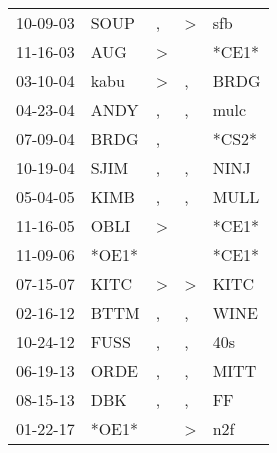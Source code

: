 \begin{supertabular}{lllll}
 10-09-03 &   SOUP &             , &     \textgreater &    sfb \\
 11-16-03 &    AUG &  \textgreater &                  &  *CE1* \\
 03-10-04 &   kabu &  \textgreater &                , &   BRDG \\
 04-23-04 &   ANDY &             , &                , &   mulc \\
 07-09-04 &   BRDG &             , &                  &  *CS2* \\
 10-19-04 &   SJIM &             , &                , &   NINJ \\
 05-04-05 &   KIMB &             , &                , &   MULL \\
 11-16-05 &   OBLI &  \textgreater &                  &  *CE1* \\
 11-09-06 &  *OE1* &               &                  &  *CE1* \\
 07-15-07 &   KITC &  \textgreater &     \textgreater &   KITC \\
 02-16-12 &   BTTM &             , &                , &   WINE \\
 10-24-12 &   FUSS &             , &                , &    40s \\
 06-19-13 &   ORDE &             , &                , &   MITT \\
 08-15-13 &    DBK &             , &                , &     FF \\
 01-22-17 &  *OE1* &               &     \textgreater &    n2f \\
\end{supertabular}
